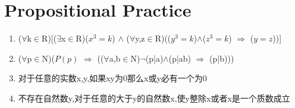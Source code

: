 \documentclass{article}
\begin{document}
	\section{Propositional Practice}
		\begin{enumerate}
			\item ($\forall$k$\in$R)[($\exists$x$\in$R)($x^3 = k$) $\wedge$ ($\forall$y,z$\in$R)(($y^3 = k$)$\wedge$($z^3 = k$) $\Rightarrow$ ($y = z$))]
			\item ($\forall$p$\in$N)($P(p)$ $\Rightarrow$ (($\forall$a,b$\in$N)$\lnot$(p|a)$\wedge$(p|ab) $\Rightarrow$ (p|b)))
			\item 对于任意的实数x,y,如果xy为0那么x或y必有一个为0
			\item 不存在自然数y,对于任意的大于y的自然数x,使y整除x或者x是一个质数成立
		\end{enumerate}
\end{document}
